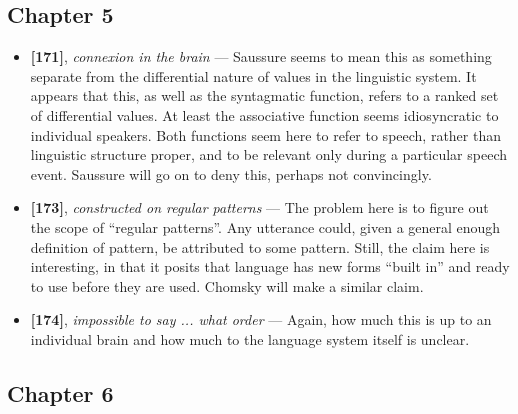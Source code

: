 \documentclass[12pt]{article}
\begin{document}
\subsection{Chapter 5}

\begin{itemize}

\item \textbf{[171]}, \textit{connexion in the brain} --- Saussure seems to mean this as something separate from the differential nature of values in the linguistic system. It appears that this, as well as the syntagmatic function, refers to a ranked set of differential values. At least the associative function seems idiosyncratic to individual speakers. Both functions seem here to refer to speech, rather than linguistic structure proper, and to be relevant only during a particular speech event. Saussure will go on to deny this, perhaps not convincingly.

\item \textbf{[173]}, \textit{constructed on regular patterns} --- The problem here is to figure out the scope of ``regular patterns''. Any utterance could, given a general enough definition of pattern, be attributed to some pattern. Still, the claim here is interesting, in that it posits that language has new forms ``built in'' and ready to use before they are used. Chomsky will make a similar claim.

\item \textbf{[174]}, \textit{impossible to say ... what order} --- Again, how much this is up to an individual brain and how much to the language system itself is unclear.

\end{itemize}

\subsection{Chapter 6}
\end{document}
